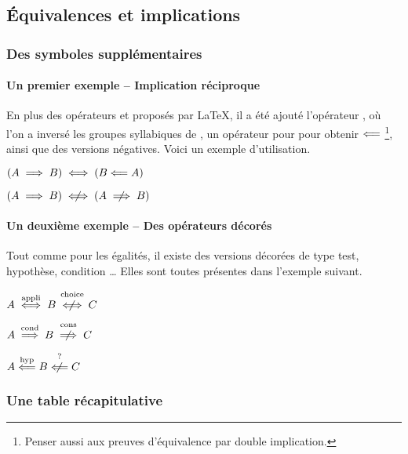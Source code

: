 \documentclass[12pt,a4paper]{article}
\begin{document}

\subsection{Équivalences et implications}

\subsubsection{Des symboles supplémentaires}

\paragraph{Un premier exemple -- Implication réciproque}

En plus des opérateurs  et  proposés par \LaTeX{}, il a été ajouté l'opérateur , où l'on a inversé les groupes syllabiques de , un opérateur pour pour obtenir $\mathrel{\Longleftarrow}$
\footnote{
	Penser aussi aux preuves d'équivalence par double implication.
},
ainsi que des versions négatives. Voici un exemple d'utilisation.

\begin{latexex}
$(A \implies B)
 \iff (B \mathrel{\Longleftarrow} A)$

$(A \implies B)
 \notiff (A \notimplies B)$
\end{latexex}




\paragraph{Un deuxième exemple -- Des opérateurs décorés}

Tout comme pour les égalités, il existe des versions décorées de type test, hypothèse, condition \dots{} 
Elles sont toutes présentes dans l'exemple suivant.

\begin{latexex}
$A \iffappli B \notiffchoice C$

$A \impliescond B \notimpliescons C$

$A \liesimphyp B \notliesimptest C$
\end{latexex}


\subsubsection{Une table récapitulative}
\end{document}
